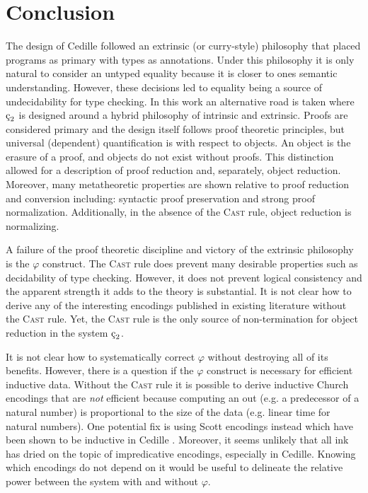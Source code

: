 \chapter{Conclusion}

The design of Cedille followed an extrinsic (or curry-style) philosophy that placed programs as primary with types as annotations.
Under this philosophy it is only natural to consider an untyped equality because it is closer to ones semantic understanding.
However, these decisions led to equality being a source of undecidability for type checking.
In this work an alternative road is taken where $\ced$ is designed around a hybrid philosophy of intrinsic and extrinsic.
Proofs are considered primary and the design itself follows proof theoretic principles, but universal (dependent) quantification is with respect to objects.
An object is the erasure of a proof, and objects do not exist without proofs.
This distinction allowed for a description of proof reduction and, separately, object reduction.
Moreover, many metatheoretic properties are shown relative to proof reduction and conversion including: syntactic proof preservation and strong proof normalization.
Additionally, in the absence of the \textsc{Cast} rule, object reduction is normalizing.

A failure of the proof theoretic discipline and victory of the extrinsic philosophy is the $\varphi$ construct.
The \textsc{Cast} rule does prevent many desirable properties such as decidability of type checking.
However, it does not prevent logical consistency and the apparent strength it adds to the theory is substantial.
It is not clear how to derive any of the interesting encodings published in existing literature without the \textsc{Cast} rule.
Yet, the \textsc{Cast} rule is the only source of non-termination for object reduction in the system $\ced$.

It is not clear how to systematically correct $\varphi$ without destroying all of its benefits.
However, there is a question if the $\varphi$ construct is necessary for efficient inductive data.
Without the \textsc{Cast} rule it is possible to derive inductive Church encodings that are \textit{not} efficient because computing an out (e.g. a predecessor of a natural number) is proportional to the size of the data (e.g. linear time for natural numbers).
One potential fix is using Scott encodings instead which have been shown to be inductive in Cedille \cite{jenkins2021monotone}.
Moreover, it seems unlikely that all ink has dried on the topic of impredicative encodings, especially in Cedille.
Knowing which encodings do not depend on it would be useful to delineate the relative power between the system with and without $\varphi$.

